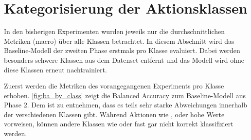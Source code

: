 \section{Kategorisierung der Aktionsklassen}
\label{sec:kategorisierung-der-aktionsklassen}

In den bisherigen Experimenten wurden jeweils nur die durchschnittlichen Metriken (macro) über alle Klassen betrachtet.
In diesem Abschnitt wird das Baseline-Modell der zweiten Phase erstmals pro Klasse evaluiert.
Dabei werden besonders schwere Klassen aus dem Datenset entfernt und das Modell wird ohne diese Klassen erneut nachtrainiert.

Zuerst werden die Metriken des vorangegangenen Experiments pro Klasse erhoben.
\autoref{fig:ba_by_class} zeigt die Balanced Accuracy zum Baseline-Modell aus Phase 2.
Dem ist zu entnehmen, dass es teils sehr starke Abweichungen innerhalb der verschiedenen Klassen gibt.
Während Aktionen wie ,  oder  hohe Werte vorweisen, können andere Klassen wie  oder  fast gar nicht korrekt klassifiziert werden.


